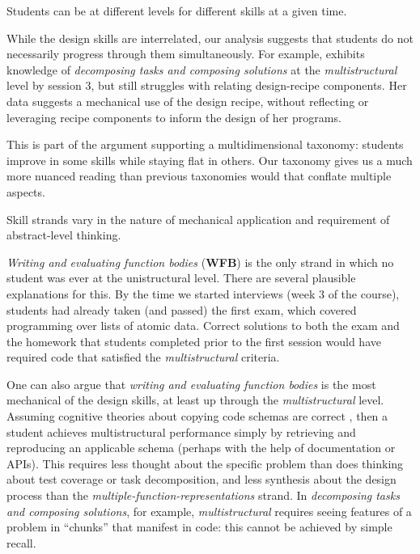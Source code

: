 \begin{obs}
Students can be at different levels for different skills at a given time.
\end{obs}

While the design skills are interrelated, our analysis suggests that
students do not necessarily progress through them simultaneously. For
example, \sthree exhibits knowledge of \emph{decomposing tasks and
composing solutions} at the \emph{multistructural} level by session 3, but
still struggles with relating design-recipe components. Her data
suggests a mechanical use of the design recipe, without reflecting or
leveraging recipe components to inform the design of her programs.

This is part of the argument supporting a multidimensional taxonomy: students
improve in some skills while staying flat in others. Our taxonomy
gives us a much more nuanced reading than previous taxonomies would
that conflate multiple aspects.

\begin{obs}
Skill strands vary in the nature of mechanical application and requirement of abstract-level thinking.
\end{obs}

\emph{Writing and evaluating function bodies} ({\bf WFB}) is the only strand in which
no student was ever at the unistructural level.  There are
several plausible explanations for this.  By the time we started
interviews (week 3 of the course), students had already taken (and
passed) the first exam, which covered programming over lists of atomic
data. Correct solutions to both the exam and the homework that
students completed prior to the first session would have required code
that satisfied the \emph{multistructural} criteria.

One can also argue that \emph{writing and evaluating function bodies} is the most mechanical
of the design skills, at least up through the \emph{multistructural} level.
Assuming cognitive theories about copying code schemas are correct \cite{Rist_1989, Rist_1991},
then a student achieves multistructural performance simply by
retrieving and reproducing an applicable schema (perhaps with the help
of documentation or APIs). This requires less thought about the
specific problem than does thinking about test coverage or task decomposition, and less
synthesis about the design process than the \emph{multiple-function-representations}
strand.  In \emph{decomposing tasks and composing solutions}, for example, \emph{multistructural} requires
seeing features of a problem in ``chunks'' that manifest in code: this
cannot be achieved by simple recall.

